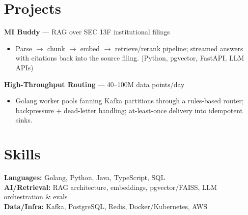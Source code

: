 \documentclass[10pt,a4paper]{article}
\begin{document}
\section{Projects}
\textbf{MI Buddy} --- RAG over SEC 13F institutional filings
\begin{itemize}
  \item Parse $\rightarrow$ chunk $\rightarrow$ embed $\rightarrow$
        retrieve/rerank pipeline; streamed answers with citations back into
        the source filing. (Python, pgvector, FastAPI, LLM APIs)
\end{itemize}
\textbf{High-Throughput Routing} --- 40--100M data points/day
\begin{itemize}
  \item Golang worker pools fanning Kafka partitions through a rules-based
        router; backpressure + dead-letter handling; at-least-once delivery
        into idempotent sinks.
\end{itemize}

\section{Skills}
\textbf{Languages:} Golang, Python, Java, TypeScript, SQL\\
\textbf{AI/Retrieval:} RAG architecture, embeddings, pgvector/FAISS,
LLM orchestration \& evals\\
\textbf{Data/Infra:} Kafka, PostgreSQL, Redis, Docker/Kubernetes, AWS
\end{document}
